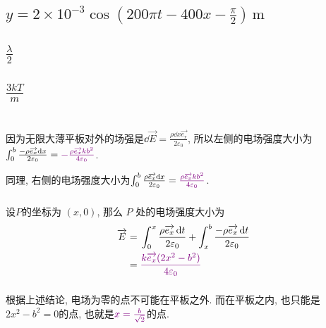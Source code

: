 \documentclass[12pt]{ctexart}
\begin{document}
\subsection{$y=2\times10^{-3}\cos(200\pi t-400x-\frac{\pi}{2})\,\mathrm{m}$}
\pagebreak
\subsection{$\frac{\lambda}{2}$}
\subsection{$\frac{3kT}{m}$}
\section{}
\subsection{}
\subsubsection{}
因为无限大薄平板对外的场强是$\dd{\overrightarrow{E}}=\frac{\rho\dd{x}\overrightarrow{e_r}}{2\varepsilon_0}$, 所以左侧的电场强度大小为$\int_{0}^{b}\frac{-\rho\overrightarrow{e_x}\dd{x}}{2\varepsilon_{0}}={\color{violet}-\frac{\rho\overrightarrow{e_{x}}kb^{2}}{4\varepsilon_{0}}}$.\par
同理, 右侧的电场强度大小为$\int_{0}^{b}\frac{\rho\overrightarrow{e_{x}}\dd{x}}{2\varepsilon_{0}}={\color{violet}\frac{\rho\overrightarrow{e_{x}}kb^{2}}{4\varepsilon_{0}}}$.\par
\subsubsection{}
设$P$的坐标为 $(x,0)$, 那么 $P$ 处的电场强度大小为
\begin{align*}
	\overrightarrow{E}={}&\int_{0}^{x}\frac{\rho\overrightarrow{e_{x}}\dd{t}}{2\varepsilon_{0}}+\int_{x}^{b}\frac{-\rho\overrightarrow{e_{x}}\dd{t}}{2\varepsilon_{0}}\\
	={}&\color{violet}\frac{k\overrightarrow{e_{x}}(2x^{2}-b^{2})}{4\varepsilon_{0}}
\end{align*}
\subsubsection{}
根据上述结论, 电场为零的点不可能在平板之外. 而在平板之内, 也只能是$2x^{2}-b^{2}=0$的点, 也就是$\color{violet}x=\frac{b}{\sqrt{2}}$的点.\par
\end{document}
